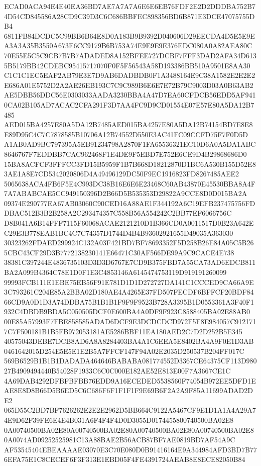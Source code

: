 \documentclass[UTF8,fontset=fandol,zihao=-4,a4paper]{ctexart}
\begin{document}
{{ECAD0ACA94E4E40EA36BD7AE7A7A7A6E6E6EB76FDF2E2D2DDDBA752B74D54CD845586A28CD9C39D3C6C686BBFEC898356BD6B871E3DCE47075755DB4
6811FB84DCDC5C99BB6B64E8D0A183B9B9392D040606D29EECDA4D5E5E9EA3A3A35B3550A673E6CC9179B6B753A74E9E9E9E376EDC080A0A82AEA80C
70E55E5C5C9CB7B7B7ADADED8A152BFEE727DCBF7FFF3DAD2AFA34D6135B5179BB42CDEBC95415717070F0F5F56543A58D193386BB510A9501E8AA30
C1C1C1EC5EAF2AB79E3E7D9AB6DADBDB0F1A3488164E9C38A1582E2E2E2E686A01E5752D2A2AE26EB193C7C9C989B6E6E7E72B79C9003D03A0B63AB2
AE5DBB56DDC56E0303033AADA3230BBA4A47D7EA60CFDCB56EDD5AF9410CA02B105AD7ACAC2CFA291F3D7AA4FC9D9CD01554E07E57E80A5DA12B7485
AED015BA4257E80A5DA12B7485AED015BA4257E80A5DA12B74154BD7E8E8E89D95C4C7C7878585B10706A12B74552D550E3AC41FC09CCFD75F7F0D5D
A1AB0AD9BC797395A5EB91234798A2870F1FA65536321EC10D6A0A5DA1ABC8646767F7EDDBB7CAC962468F1E4DE9F5EBD7E752E6CE9D4B29868686D0
15BA8ACFCF3FFFCC3FD15B5959F1B7B668D18212870D1BC6A530B155D52E83AE1A8E7CD5342020806D4A49496129DC50F9EC1916823FD8267485AEE2
5065638ACA4FB6F5E4C993DC38B16E6E6E23468C60AB43870E45530BBA8A4F7A7ABABCAE5CC949150396D2B66D5B535353D29822A9CCE8D0D015BA2A
09374E290777EA67AB03060C90CED16A88AE1F344192A6C19EFB237475756FDDBAC512B3B2B258A2C293474357C558B56A554242C2BB77EF6066756C
D8B041A6B14FFF7115F60068ACAE2121210D1B366CD0A0011517D0B23A642EC29E3B778EAB1BC4C7C74357D1744D4B4B93602921655D49035A363030
30323262FDAED299924C132A03F421BD7BF78693352F5D258B26E84A05C5B265CBC43CF29D3B7772138230141E66471C30AF566DE99A9C9CACE4E738
38381C397244E4836735103D3D3D6767E7CD9B375FBD7A55CA73AD6EDCB811BA2A099B4364C78E1D0F1E3C4853146A6145474753119D919191260099
99993FCB111E1EBE75EB56F91E781D1D1D272727DA141C1CCCED9CA66A9E3C793261C204E85A2BBA02D180AE4A4265E37FD507FECDF6BFFCF20BDF84
66CD9A0D1D3A74DDBA75B1B1B1F9F9F9523B728A3395B1D0553361A3F40F1932C4DBDB9BDA5C050505DCF0E600BA4A0DF9F923C8588405BA02E88AB0
00E85A57993F7FBE858585ADAD6DCF9E3DCDCDCD972F5F8E984057C9121717C7F500181B1B5FB972053181AE5286BBF11EA180AED2C7D2D252B5E345
40575043DEBE7DCB8AD6A8A8284403BA4A1C6EEA5E8402BA4A9F0E1D3AB0461642015D254E5E5E1E2B5A7FFCF147F94A02E2035D250537B204FF017C
569B6529B1B1B1DADADA464646BABABA081774552D3367CE64375CF113D98027B4909494440B54028F1933C6C0C000E182AE52E813E00F7A3667CE1C
4A69DAB4292DFBFBFBB76EDD9A16ECEDED5538560F74054B972EE5DFD1EAE8E8D8B66D5B6ED5C6C686F6F1F1F1F9E69B6F2A2A9F85A11699ADAD2DE2
065D55C2BD7BF7626262E2E2E2962D5BB664C9122A5467CF9E1D1A1A4A29A74E9D62F39FE6E4E4B031A6F4F4F4D0D3055D0174455800740500BA02E8
0A00740500BA02E80A00740500BA02E80A00740500BA02E80A00740500BA02E80A0074AD09252525981C13A88BAE2B56ACB87BF7AE0819BD7AF54A9C
AF53545404EBEAAAAE03070E3C70E080D0B91416164E9A344984AFD3BD7B776EFA75E1C8CECEF6F3F313E1EBD05F4FE4391724AEAB8E8ECE82050B84
}}
\end{document}

